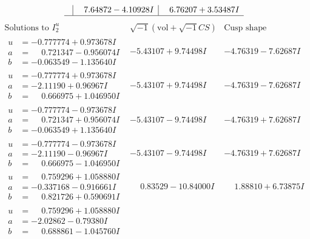 \documentclass[1p]{elsarticle_modified}
\theoremstyle{definition}
\newcommand{\I}{\sqrt{-1}}
\begin{document}
$$\begin{array}{c|c|c}
 & \phantom{-}7.64872 - 4.10928 I & \phantom{-}6.76207 + 3.53487 I\\
 \hline 
 \end{array}$$\newpage$$\begin{array}{c|c|c}  
\text{Solutions to }I^u_{2}& \I (\text{vol} + \sqrt{-1}CS) & \text{Cusp shape}\\
 \hline 
\begin{aligned}
u &= -0.777774 + 0.973678 I \\
a &= \phantom{-}0.721347 - 0.956074 I \\
b &= -0.063549 - 1.135640 I\end{aligned}
 & -5.43107 + 9.74498 I & -4.76319 - 7.62687 I \\ \hline\begin{aligned}
u &= -0.777774 + 0.973678 I \\
a &= -2.11190 + 0.96967 I \\
b &= \phantom{-}0.666975 + 1.046950 I\end{aligned}
 & -5.43107 + 9.74498 I & -4.76319 - 7.62687 I \\ \hline\begin{aligned}
u &= -0.777774 - 0.973678 I \\
a &= \phantom{-}0.721347 + 0.956074 I \\
b &= -0.063549 + 1.135640 I\end{aligned}
 & -5.43107 - 9.74498 I & -4.76319 + 7.62687 I \\ \hline\begin{aligned}
u &= -0.777774 - 0.973678 I \\
a &= -2.11190 - 0.96967 I \\
b &= \phantom{-}0.666975 - 1.046950 I\end{aligned}
 & -5.43107 - 9.74498 I & -4.76319 + 7.62687 I \\ \hline\begin{aligned}
u &= \phantom{-}0.759296 + 1.058880 I \\
a &= -0.337168 - 0.916661 I \\
b &= \phantom{-}0.821726 + 0.590691 I\end{aligned}
 & \phantom{-}0.83529 - 10.84000 I & \phantom{-}1.88810 + 6.73875 I \\ \hline\begin{aligned}
u &= \phantom{-}0.759296 + 1.058880 I \\
a &= -2.02862 - 0.79380 I \\
b &= \phantom{-}0.688861 - 1.045760 I\end{aligned}

\end{array}$$
\end{document}
